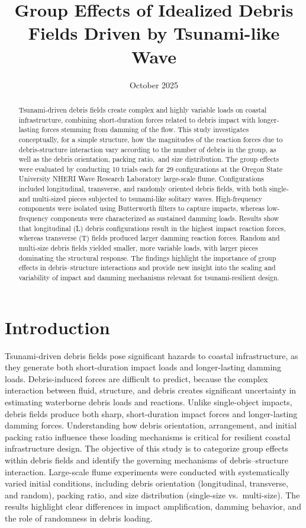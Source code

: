 \documentclass{article}
\title{Group Effects of Idealized Debris Fields Driven by Tsunami-like Wave}
\date{October 2025}
\begin{document}
\maketitle
\begin{abstract}
Tsunami-driven debris fields create complex and highly variable loads on coastal infrastructure, combining short-duration forces related to debris impact with longer-lasting forces stemming from damming of the flow. This study investigates conceptually, for a simple structure, how the magnitudes of the reaction forces due to debris-structure interaction vary according to the number of debris in the group, as well as the debris orientation, packing ratio,\ and size distribution. The group effects were evaluated by conducting 10 trials each for 29 configurations at the Oregon State University NHERI Wave Research Laboratory large-scale flume. Configurations included longitudinal, transverse, and randomly oriented debris fields, with both single- and multi-sized pieces subjected to tsunami-like solitary waves. High-frequency components were isolated using Butterworth filters to capture impacts, whereas low-frequency components were characterized as sustained damming loads. Results show that longitudinal (L) debris configurations result in the highest impact reaction forces, whereas transverse (T) fields produced larger damming reaction forces. Random and multi-size debris fields yielded smaller, more variable loads, with larger pieces dominating the structural response. The findings highlight the importance of group effects in debris–structure interactions and provide new insight into the scaling and variability of impact and damming mechanisms relevant for tsunami-resilient design.
\end{abstract}

\section{Introduction}
Tsunami-driven debris fields pose significant hazards to coastal infrastructure, as they generate both short-duration impact loads and longer-lasting damming loads. Debris-induced forces are difficult to predict, because the complex interaction between fluid, structure, and debris creates significant uncertainty in estimating waterborne debris loads and reactions. Unlike single-object impacts, debris fields produce both sharp, short-duration impact forces and longer-lasting damming forces. Understanding how debris orientation, arrangement, and initial packing ratio influence these loading mechanisms is critical for resilient coastal infrastructure design. The objective of this study is to categorize group effects within debris fields and identify the governing mechanisms of debris–structure interaction. Large-scale flume experiments were conducted with systematically varied initial conditions, including debris orientation (longitudinal, transverse, and random), packing ratio, and size distribution (single-size vs.\ multi-size). The results highlight clear differences in impact amplification, damming behavior, and the role of randomness in debris loading.
\end{document}
